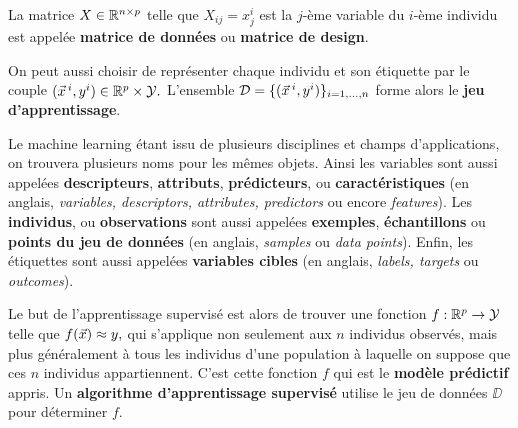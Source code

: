 La matrice $X \in \mathbb{R}^{n \times p}$ telle que $X_{ij} = x^i_j$ est la $j$-ème
variable du $i$-ème individu est appelée \textbf{matrice de données} ou
\textbf{matrice de design}. 

On peut aussi choisir de représenter chaque individu et son étiquette par le
couple $(\xx^i, y^i) \in \RR^{p} \times \YY.$ L'ensemble
$\DD = \{(\xx^i, y^i)\}_{i=1, \dots, n}$ forme alors le \textbf{jeu d'apprentissage}.

Le machine learning étant issu de plusieurs disciplines et champs
d'applications, on trouvera plusieurs noms pour les mêmes objets.  Ainsi les
variables sont aussi appelées \textbf{descripteurs}, \textbf{attributs},
\textbf{prédicteurs}, ou \textbf{caractéristiques} (en anglais,
\textit{variables, descriptors, attributes, predictors} ou encore
\textit{features}).  Les \textbf{individus}, ou \textbf{observations} sont
aussi appelées \textbf{exemples}, \textbf{échantillons} ou \textbf{points du
  jeu de données} (en anglais, \textit{samples} ou \textit{data
  points}). Enfin, les étiquettes sont aussi appelées \textbf{variables cibles}
(en anglais, \textit{labels, targets} ou \textit{outcomes}).



Le but de l'apprentissage supervisé est alors de trouver une fonction
$f: \mathbb{R}^p \to \mathcal{Y}$ telle que $f(\xx) \approx y,$ qui s'applique non
seulement aux $n$ individus observés, mais plus généralement à tous les
individus d'une population à laquelle on suppose que ces $n$ individus
appartiennent. C'est cette fonction $f$ qui est le \textbf{modèle prédictif}
appris. Un \textbf{algorithme d'apprentissage supervisé} utilise le jeu de
données $\DD$ pour déterminer $f$.

